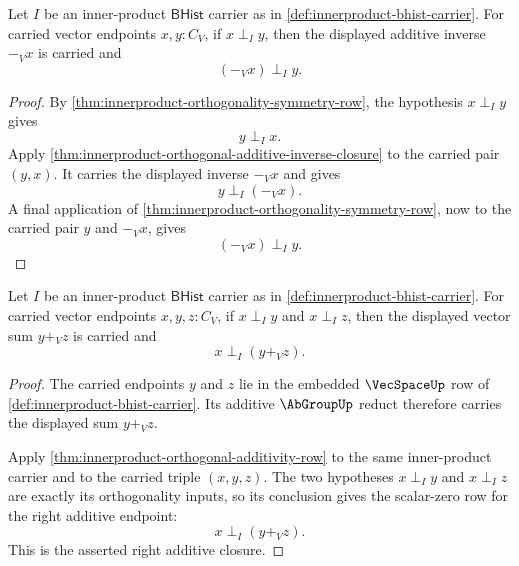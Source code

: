\begin{theorem}
\label{thm:innerproduct-orthogonality-left-additive-inverse-closure}
Let $I$ be an inner-product $\mathsf{BHist}$ carrier as in
\autoref{def:innerproduct-bhist-carrier}. For carried vector endpoints
$x,y:C_V$, if $x\perp_I y$, then the displayed additive inverse $-_V x$ is
carried and
$$
(-_V x)\perp_I y.
$$
\end{theorem}
\begin{proof}
By \autoref{thm:innerproduct-orthogonality-symmetry-row}, the hypothesis
$x\perp_I y$ gives
$$
y\perp_I x.
$$
Apply \autoref{thm:innerproduct-orthogonal-additive-inverse-closure} to the
carried pair $(y,x)$. It carries the displayed inverse $-_V x$ and gives
$$
y\perp_I(-_V x).
$$
A final application of \autoref{thm:innerproduct-orthogonality-symmetry-row},
now to the carried pair $y$ and $-_V x$, gives
$$
(-_V x)\perp_I y.
$$
\end{proof}

\begin{theorem}
\label{thm:innerproduct-orthogonality-right-additive-closure}
Let $I$ be an inner-product $\mathsf{BHist}$ carrier as in
\autoref{def:innerproduct-bhist-carrier}. For carried vector endpoints
$x,y,z:C_V$, if $x\perp_I y$ and $x\perp_I z$, then the displayed vector sum
$y+_V z$ is carried and
$$
x\perp_I (y+_V z).
$$
\end{theorem}
\begin{proof}
The carried endpoints $y$ and $z$ lie in the embedded $\VecSpaceUp$ row of
\autoref{def:innerproduct-bhist-carrier}. Its additive $\AbGroupUp$ reduct
therefore carries the displayed sum $y+_V z$.

Apply \autoref{thm:innerproduct-orthogonal-additivity-row} to the same
inner-product carrier and to the carried triple $(x,y,z)$. The two hypotheses
$x\perp_I y$ and $x\perp_I z$ are exactly its orthogonality inputs, so its
conclusion gives the scalar-zero row for the right additive endpoint:
$$
x\perp_I (y+_V z).
$$
This is the asserted right additive closure.
\end{proof}
